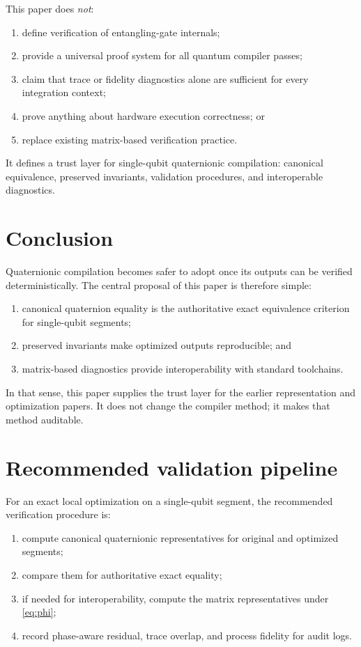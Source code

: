 \documentclass[11pt]{article}
\theoremstyle{remark}
\begin{document}
This paper does \emph{not}:
\begin{enumerate}[label=(\arabic*), leftmargin=1.5em]
\item define verification of entangling-gate internals;
\item provide a universal proof system for all quantum compiler passes;
\item claim that trace or fidelity diagnostics alone are sufficient for every
integration context;
\item prove anything about hardware execution correctness; or
\item replace existing matrix-based verification practice.
\end{enumerate}

It defines a trust layer for single-qubit quaternionic compilation: canonical
equivalence, preserved invariants, validation procedures, and interoperable
diagnostics.

\section{Conclusion}

Quaternionic compilation becomes safer to adopt once its outputs can be verified
deterministically. The central proposal of this paper is therefore simple:
\begin{enumerate}[label=(\arabic*), leftmargin=1.5em]
\item canonical quaternion equality is the authoritative exact equivalence
criterion for single-qubit segments;
\item preserved invariants make optimized outputs reproducible; and
\item matrix-based diagnostics provide interoperability with standard
toolchains.
\end{enumerate}

In that sense, this paper supplies the trust layer for the earlier
representation and optimization papers. It does not change the compiler method;
it makes that method auditable.

\appendix

\section{Recommended validation pipeline}

For an exact local optimization on a single-qubit segment, the recommended
verification procedure is:
\begin{enumerate}[label=(\arabic*), leftmargin=1.5em]
\item compute canonical quaternionic representatives for original and optimized
segments;
\item compare them for authoritative exact equality;
\item if needed for interoperability, compute the matrix representatives under
\eqref{eq:phi};
\item record phase-aware residual, trace overlap, and process fidelity for audit
logs.
\end{enumerate}
\end{document}
